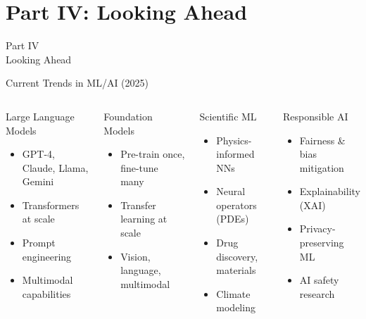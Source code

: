 \documentclass[aspectratio=169,11pt]{beamer}
\begin{document}
\section{Part IV: Looking Ahead}

\begin{frame}{}
\begin{center}
{\Huge \textcolor{hec-blue}{Part IV}}\\[1em]
{\LARGE Looking Ahead}
\end{center}
\end{frame}

\begin{frame}{Current Trends in ML/AI (2025)}
\begin{columns}
\begin{block}{Large Language Models}
\begin{itemize}
    \item GPT-4, Claude, Llama, Gemini
    \item Transformers at scale
    \item Prompt engineering
    \item Multimodal capabilities
\end{itemize}
\end{block}

\begin{block}{Foundation Models}
\begin{itemize}
    \item Pre-train once, fine-tune many
    \item Transfer learning at scale
    \item Vision, language, multimodal
\end{itemize}
\end{block}

\begin{block}{Scientific ML}
\begin{itemize}
    \item Physics-informed NNs
    \item Neural operators (PDEs)
    \item Drug discovery, materials
    \item Climate modeling
\end{itemize}
\end{block}

\begin{block}{Responsible AI}
\begin{itemize}
    \item Fairness \& bias mitigation
    \item Explainability (XAI)
    \item Privacy-preserving ML
    \item AI safety research
\end{itemize}
\end{block}
\end{columns}
\end{frame}
\end{document}
